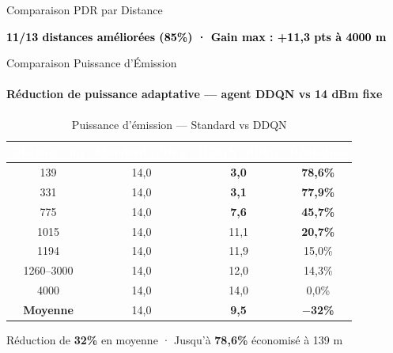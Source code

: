 \documentclass[aspectratio=169, 11pt]{beamer}
\begin{document}
\begin{frame}{Comparaison PDR par Distance}
	
				
			\centering
			{\footnotesize\textcolor{black}{\textbf{11/13 distances améliorées (85\%) · Gain max : +11,3 pts à 4000 m}}}

	
	\end{frame}
	
	\begin{frame}{Comparaison Puissance d'Émission}
		\framesubtitle{Réduction de puissance adaptative — agent DDQN vs 14 dBm fixe}
		
		\begin{table}
			\centering
			\renewcommand{\arraystretch}{1.2}
			\fontsize{8}{10}\selectfont
			\begin{tabular}{|c|c|c|c|}
				\hline
				\rowcolor{blue!50}
				\textcolor{white}{\textbf{Distance (m)}} &
				\textcolor{white}{\textbf{Standard (dBm)}} &
				\textcolor{white}{\textbf{DDQN (dBm)}} &
				\textcolor{white}{\textbf{Réduction}} \\
				\hline
				139  & 14,0 & \textbf{3,0}  & \cellcolor{green!10}\textcolor{green!50!black}{\textbf{78,6\%}} \\
				\hline
				331  & 14,0 & \textbf{3,1}  & \cellcolor{green!10}\textcolor{green!50!black}{\textbf{77,9\%}} \\
				\hline
				775  & 14,0 & \textbf{7,6}  & \cellcolor{green!10}\textcolor{green!50!black}{\textbf{45,7\%}} \\
				\hline
				1015 & 14,0 & 11,1 & \cellcolor{green!10}\textcolor{green!50!black}{\textbf{20,7\%}} \\
				\hline
				1194 & 14,0 & 11,9 &\cellcolor{green!10}\textcolor{green!50!black} {15,0\%} \\
				\hline
				1260--3000 & 14,0 & 12,0 & \cellcolor{green!10}\textcolor{green!50!black} {14,3}\% \\
				\hline
				4000 & 14,0 & 14,0 & 0,0\% \\
				\hline\hline
				\rowcolor{cyan!30}
				\textbf{Moyenne} & 14,0 & \textbf{9,5} &
				\cellcolor{green!10}\textcolor{green!50!black}{\textbf{$-$32\%}} \\
				\hline
			\end{tabular}
			\caption{Puissance d'émission — Standard vs DDQN}
			\label{tab:comparaison_puissance}
		\end{table}
		
		\begin{tcolorbox}[
			colback=green!10, colframe=green!50!black, boxrule=0.8pt,
			left=6pt, right=6pt, top=3pt, bottom=3pt, sharp corners
			]
			\centering
			\small\textcolor{green!50!black}{
				Réduction de \textbf{32\%} en moyenne · Jusqu'à \textbf{78,6\%} économisé à 139 m}
		\end{tcolorbox}
	\end{frame}
	
\end{document}
